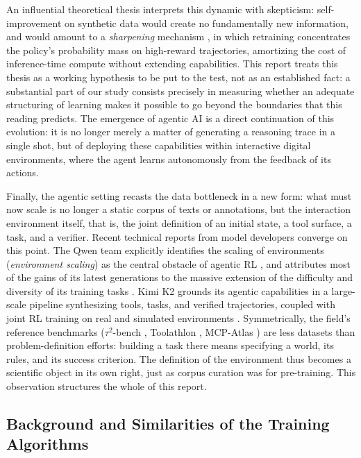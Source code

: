 \documentclass[11pt,a4paper]{article}
\begin{document}
An influential theoretical thesis interprets this dynamic with skepticism: self-improvement on synthetic data would create no fundamentally new information, and would amount to a \emph{sharpening} mechanism \cite{huang2024self}, in which retraining concentrates the policy's probability mass on high-reward trajectories, amortizing the cost of inference-time compute without extending capabilities. This report treats this thesis as a working hypothesis to be put to the test, not as an established fact: a substantial part of our study consists precisely in measuring whether an adequate structuring of learning makes it possible to go beyond the boundaries that this reading predicts. The emergence of agentic AI is a direct continuation of this evolution: it is no longer merely a matter of generating a reasoning trace in a single shot, but of deploying these capabilities within interactive digital environments, where the agent learns autonomously from the feedback of its actions.

Finally, the agentic setting recasts the data bottleneck in a new form: what must now scale is no longer a static corpus of texts or annotations, but the interaction environment itself, that is, the joint definition of an initial state, a tool surface, a task, and a verifier. Recent technical reports from model developers converge on this point. The Qwen team explicitly identifies the scaling of environments (\emph{environment scaling}) as the central obstacle of agentic RL \cite{qwen3coder2025}, and attributes most of the gains of its latest generations to the massive extension of the difficulty and diversity of its training tasks \cite{qwen35_2026}. Kimi K2 grounds its agentic capabilities in a large-scale pipeline synthesizing tools, tasks, and verified trajectories, coupled with joint RL training on real and simulated environments \cite{kimik2_2025}. Symmetrically, the field's reference benchmarks ($\tau^2$-bench \cite{tau2bench2025}, Toolathlon \cite{toolathlon2025}, MCP-Atlas \cite{mcpatlas2026}) are less datasets than problem-definition efforts: building a task there means specifying a world, its rules, and its success criterion. The definition of the environment thus becomes a scientific object in its own right, just as corpus curation was for pre-training. This observation structures the whole of this report.

\subsection{Background and Similarities of the Training Algorithms}
\end{document}
